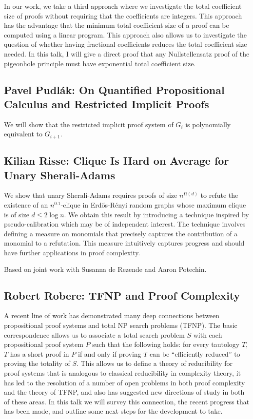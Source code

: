 \documentclass[11pt]{article}
\begin{document}
In our work, we take a third approach where we investigate the total coefficient size of proofs without requiring that the coefficients are integers. This approach has the advantage that the minimum total coefficient size of a proof can be computed using a linear program. This approach also allows us to investigate the question of whether having fractional coefficients reduces the total coefficient size needed. In this talk, I will give a direct proof that any Nullstellensatz proof of the pigeonhole principle must have exponential total coefficient size. 



\subsection*{Pavel Pudl\'{a}k: On Quantified Propositional Calculus and Restricted Implicit Proofs}\label{Pudlak}

We will show that the restricted implicit proof system of $G_i$ is
polynomially equivalent to $G_{i+1}$.

\subsection*{Kilian Risse: Clique Is Hard on Average for Unary Sherali-Adams}\label{Risse}

We show that unary Sherali-Adams requires proofs of size $n^{\Omega(d)}$
to refute the existence of an $n^{0.1}$-clique in Erd\H{o}s-R\'{e}nyi
random graphs whose maximum clique is of size  $d\leq 2\log n$. We
obtain this result by introducing a technique inspired by
pseudo-calibration which may be of independent interest. The technique
involves defining a measure on monomials that precisely captures the
contribution of a monomial to a refutation. This measure intuitively
captures progress and should have further applications in proof complexity.

Based on joint work with Susanna de Rezende and Aaron Potechin.


\subsection*{Robert Robere: TFNP and Proof Complexity}\label{Robere}
A recent line of work has demonstrated many deep connections between propositional proof systems and total NP search problems (TFNP). The basic correspondence allows us to associate a total search problem $S$ with each propositional proof system $P$ such that the following holds: for every tautology $T$, $T$ has a short proof in $P$ if and only if proving $T$ can be “efficiently reduced” to proving the totality of $S$. This allows us to define a theory of reducibility for proof systems that is analogous to classical reducibility in complexity theory, it has led to the resolution of a number of open problems in both proof complexity and the theory of TFNP, and also has suggested new directions of study in both of these areas. In this talk we will survey this connection, the recent progress that has been made, and outline some next steps for the development to take.
\end{document}
